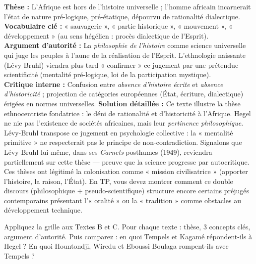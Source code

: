 \documentclass[11pt]{article}
\newcommand{\cle}[1]{{\popxbold\color{popdark}#1}}
\begin{document}
\begin{exoresolu}
\textbf{Thèse :} L'Afrique est hors de l'histoire universelle ; l'homme africain incarnerait l'état de nature pré-logique, pré-étatique, dépourvu de rationalité dialectique. \\
\textbf{Vocabulaire clé :} « sauvagerie », « partie historique », « mouvement », « développement » (au sens hégélien : procès dialectique de l'Esprit). \\
\textbf{Argument d'autorité :} La \emph{philosophie de l'histoire} comme science universelle qui juge les peuples à l'aune de la réalisation de l'Esprit. L'ethnologie naissante (Lévy-Bruhl) viendra plus tard « confirmer » ce jugement par une prétendue scientificité (mentalité pré-logique, loi de la participation mystique). \\
\textbf{Critique interne :} Confusion entre \emph{absence d'histoire écrite} et \emph{absence d'historicité} ; projection de catégories européennes (État, écriture, dialectique) érigées en normes universelles.
\tcblower
\textbf{Solution détaillée :} Ce texte illustre la \cle{thèse ethnocentriste} fondatrice : le déni de rationalité et d'historicité à l'Afrique. Hegel ne nie pas l'existence de sociétés africaines, mais leur \emph{pertinence philosophique}. Lévy-Bruhl transpose ce jugement en psychologie collective : la « mentalité primitive » ne respecterait pas le principe de non-contradiction. Signalons que Lévy-Bruhl lui-même, dans ses \emph{Carnets} posthumes (1949), reviendra partiellement sur cette thèse — preuve que la science progresse par autocritique. Ces thèses ont légitimé la colonisation comme « mission civilisatrice » (apporter l'histoire, la raison, l'État). En TP, vous devez montrer comment ce double discours (philosophique + pseudo-scientifique) structure encore certains préjugés contemporains présentant l'« oralité » ou la « tradition » comme obstacles au développement technique.
\end{exoresolu}

\begin{exercice}
Appliquez la grille aux Textes B et C. Pour chaque texte : thèse, 3 concepts clés, argument d'autorité. Puis comparez : en quoi Tempels et Kagamé répondent-ils à Hegel ? En quoi Hountondji, Wiredu et Eboussi Boulaga rompent-ils avec Tempels ?
\end{exercice}
\end{document}
